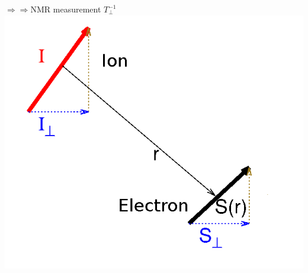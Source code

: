 \documentclass[amssymb,amsmath]{beamer}
\begin{document}
\begin{frame}
{{$\Rightarrow\Rightarrow$NMR measurement
$T_{\perp}^{-1}$}}
\includegraphics[scale=0.197]{./figures/Fig_rel_time.png}
\end{frame}
\end{document}
